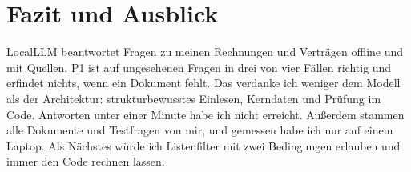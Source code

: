 
\chapter{Fazit und Ausblick}
\label{chap:fazit}

LocalLLM beantwortet Fragen zu meinen Rechnungen und Verträgen offline und mit Quellen. P1 ist auf ungesehenen Fragen in drei von vier Fällen richtig und erfindet nichts, wenn ein Dokument fehlt. Das verdanke ich weniger dem Modell als der Architektur: strukturbewusstes Einlesen, Kerndaten und Prüfung im Code. Antworten unter einer Minute habe ich nicht erreicht. Außerdem stammen alle Dokumente und Testfragen von mir, und gemessen habe ich nur auf einem Laptop. Als Nächstes würde ich Listenfilter mit zwei Bedingungen erlauben und immer den Code rechnen lassen.
